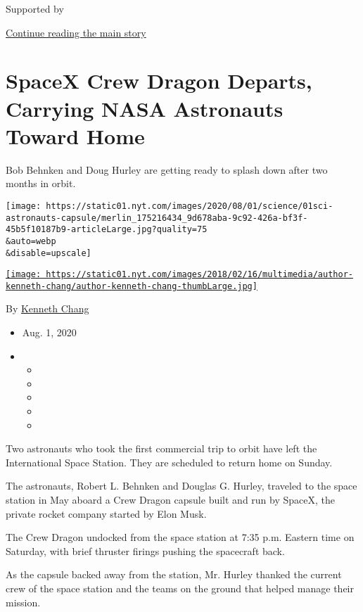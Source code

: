 Supported by

\protect\hyperlink{after-sponsor}{Continue reading the main story}

\hypertarget{spacex-crew-dragon-departs-carrying-nasa-astronauts-toward-home}{%
\section{SpaceX Crew Dragon Departs, Carrying NASA Astronauts Toward
Home}\label{spacex-crew-dragon-departs-carrying-nasa-astronauts-toward-home}}

Bob Behnken and Doug Hurley are getting ready to splash down after two
months in orbit.

\texttt{[image: https://static01.nyt.com/images/2020/08/01/science/01sci-astronauts-capsule/merlin\_175216434\_9d678aba-9c92-426a-bf3f-45b5f10187b9-articleLarge.jpg?quality=75\\\&auto=webp\\\&disable=upscale]}

\href{https://www.nytimes.com/by/kenneth-chang}{\texttt{[image: https://static01.nyt.com/images/2018/02/16/multimedia/author-kenneth-chang/author-kenneth-chang-thumbLarge.jpg]}}

By \href{https://www.nytimes.com/by/kenneth-chang}{Kenneth Chang}

\begin{itemize}
\item
  Aug. 1, 2020
\item
  \begin{itemize}
  \item
  \item
  \item
  \item
  \item
  \end{itemize}
\end{itemize}

Two astronauts who took the first commercial trip to orbit have left the
International Space Station. They are scheduled to return home on
Sunday.

The astronauts, Robert L. Behnken and Douglas G. Hurley, traveled to the
space station in May aboard a Crew Dragon capsule built and run by
SpaceX, the private rocket company started by Elon Musk.

The Crew Dragon undocked from the space station at 7:35 p.m. Eastern
time on Saturday, with brief thruster firings pushing the spacecraft
back.

As the capsule backed away from the station, Mr. Hurley thanked the
current crew of the space station and the teams on the ground that
helped manage their mission.

